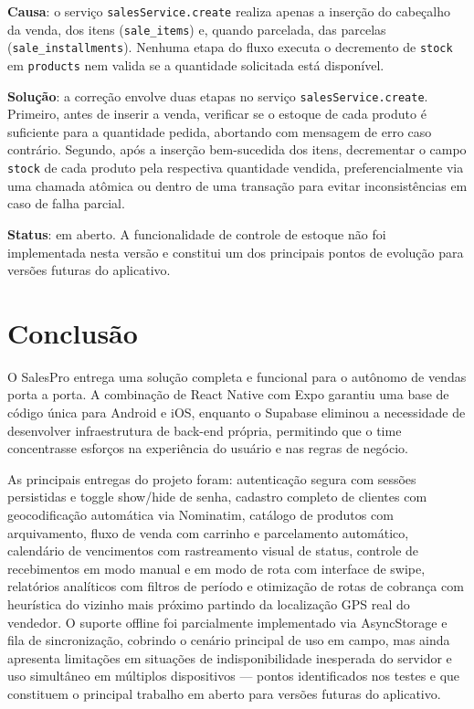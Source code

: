 \documentclass[
	12pt,				%
	oneside,			%
	a4paper,			%
	english,			%
	brazil				%
	]{abntex2}
\begin{document}
\textbf{Causa}: o serviço \texttt{salesService.create} realiza apenas a inserção do cabeçalho da venda, dos itens (\texttt{sale\_items}) e, quando parcelada, das parcelas (\texttt{sale\_installments}). Nenhuma etapa do fluxo executa o decremento de \texttt{stock} em \texttt{products} nem valida se a quantidade solicitada está disponível.

\textbf{Solução}: a correção envolve duas etapas no serviço \texttt{salesService.create}. Primeiro, antes de inserir a venda, verificar se o estoque de cada produto é suficiente para a quantidade pedida, abortando com mensagem de erro caso contrário. Segundo, após a inserção bem-sucedida dos itens, decrementar o campo \texttt{stock} de cada produto pela respectiva quantidade vendida, preferencialmente via uma chamada atômica ou dentro de uma transação para evitar inconsistências em caso de falha parcial.

\textbf{Status}: em aberto. A funcionalidade de controle de estoque não foi implementada nesta versão e constitui um dos principais pontos de evolução para versões futuras do aplicativo.

\chapter*[Conclusão]{Conclusão}

O SalesPro entrega uma solução completa e funcional para o autônomo de vendas porta a porta. A combinação de React Native com Expo garantiu uma base de código única para Android e iOS, enquanto o Supabase eliminou a necessidade de desenvolver infraestrutura de back-end própria, permitindo que o time concentrasse esforços na experiência do usuário e nas regras de negócio.

As principais entregas do projeto foram: autenticação segura com sessões persistidas e toggle show/hide de senha, cadastro completo de clientes com geocodificação automática via Nominatim, catálogo de produtos com arquivamento, fluxo de venda com carrinho e parcelamento automático, calendário de vencimentos com rastreamento visual de status, controle de recebimentos em modo manual e em modo de rota com interface de swipe, relatórios analíticos com filtros de período e otimização de rotas de cobrança com heurística do vizinho mais próximo partindo da localização GPS real do vendedor. O suporte offline foi parcialmente implementado via AsyncStorage e fila de sincronização, cobrindo o cenário principal de uso em campo, mas ainda apresenta limitações em situações de indisponibilidade inesperada do servidor e uso simultâneo em múltiplos dispositivos — pontos identificados nos testes e que constituem o principal trabalho em aberto para versões futuras do aplicativo.
\end{document}
